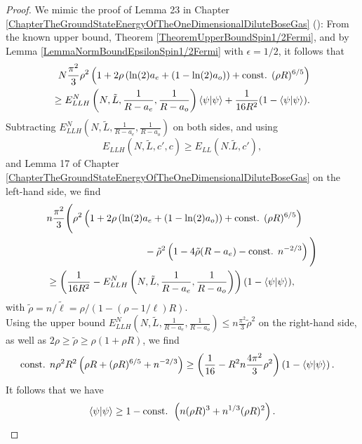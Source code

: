 \begin{proof}
	We mimic the proof of Lemma 23 in Chapter \ref{ChapterTheGroundStateEnergyOfTheOneDimensionalDiluteBoseGas} (\cite{agerskov2022ground}): From the known upper bound, \ie Theorem \ref{TheoremUpperBoundSpin1/2Fermi}, and by Lemma \ref{LemmaNormBoundEpsilonSpin1/2Fermi} with $ \epsilon=1/2 $, it follows that 
    \begin{equation}
    \begin{aligned}
    N\frac{\pi^2}{3}\rho^2\left(1+2\rho\left( \ln(2)a_e+(1-\ln(2)a_o) \right)+\text{const. }(\rho R)^{6/5}\right)\\\geq E_{LLH}^N \left(N,\tilde{L},\frac{1}{R-a_e},\frac{1}{R-a_o}\right)\left\langle\psi|\psi\right\rangle+ \frac{1}{16R^2}(1-\left\langle\psi|\psi\right\rangle).
    \end{aligned}
    \end{equation}
	Subtracting $ E_{LLH}^N \left(N,\tilde{L},\frac{1}{R-a_e},\frac{1}{R-a_o}\right) $ on both sides, and using $$ E_{LLH}(N,\tilde{L},c',c)\geq E_{LL}(N.\tilde{L},c'), $$ and Lemma 17 of Chapter \ref{ChapterTheGroundStateEnergyOfTheOneDimensionalDiluteBoseGas} on the left-hand side, we find\begin{equation}
	\begin{aligned}
	&n\frac{\pi^2}{3}\Bigg(\rho^2\left(1+2\rho\left( \ln(2)a_e+(1-\ln(2)a_o) \right)+\text{const. }(\rho R)^{6/5}\right)\\&\qquad \qquad\qquad\qquad\qquad-\tilde{\rho}^2\left(1-4\tilde{\rho} (R-a_e)-\text{const. }n^{-2/3}\right)\Bigg)\\
	&\geq  \left(\frac{1}{16R^2}-E_{LLH}^N \left(N,\tilde{L},\frac{1}{R-a_e},\frac{1}{R-a_o}\right)\right)(1-\left\langle\psi|\psi\right\rangle),
	\end{aligned}
	\end{equation}
	with $ \tilde{\rho}=n/\tilde{\ell}=\rho/(1-(\rho-1/\ell)R)$.\\
	Using the upper bound $ E_{LLH}^N \left(N,\tilde{L},\frac{1}{R-a_e},\frac{1}{R-a_o}\right)\leq n\frac{\pi^2}{3}\tilde{\rho}^2 $ on the right-hand side, as well as $ 2\rho \geq\tilde{\rho}\geq \rho(1+\rho R)$, we find
	\begin{equation}
	\begin{aligned}
	\text{const. }n\rho^2R^2\left(\rho R+(\rho R)^{6/5}+n^{-2/3}\right)&\geq \left(\frac{1}{16}-R^2n\frac{4\pi^2}{3}\rho^2\right)\left(1-\left\langle\psi|\psi\right\rangle\right).
	\end{aligned}
	\end{equation}
	It follows that we have \begin{equation}
	\left\langle\psi|\psi\right\rangle\geq 1-\text{const. }\left(n(\rho R)^3+n^{1/3}(\rho R)^2\right).
	\end{equation}
\end{proof}
